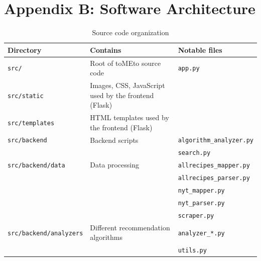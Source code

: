 \documentclass{acm_proc_article-sp}
\begin{document}
\clearpage
\onecolumn
\section*{Appendix B: Software Architecture}
\vspace{3mm} %

\begin{table}[h]
       \begin{tabular}{ | l | l | p{5cm} |}
       \hline
       Directory & Contains & Notable files \\ 
       \hline
       \texttt{src/} & Root of toMEto source code & \texttt{app.py} \\ \hline
       \texttt{src/static} & Images, CSS, JavaScript used by the frontend (Flask) & \\ \hline
       \texttt{src/templates} & HTML templates used by the frontend (Flask) & \\ \hline
       \texttt{src/backend} & Backend scripts & \texttt{algorithm\_analyzer.py} \\
                            &                 & \texttt{search.py} \\ \hline
       \texttt{src/backend/data} & Data processing & \texttt{allrecipes\_mapper.py} \\
                                 &                 & \texttt{allrecipes\_parser.py} \\
                                 &                 & \texttt{nyt\_mapper.py}  \\
                                 &                 & \texttt{nyt\_parser.py} \\ 
                                 &                 & \texttt{scraper.py} \\ \hline
       \texttt{src/backend/analyzers} & Different recommendation algorithms & \texttt{analyzer\_*.py} \\
                                      &                                     & \texttt{utils.py} \\ \hline
       \end{tabular}
       \caption{Source code organization}
\end{table}
\end{document}
